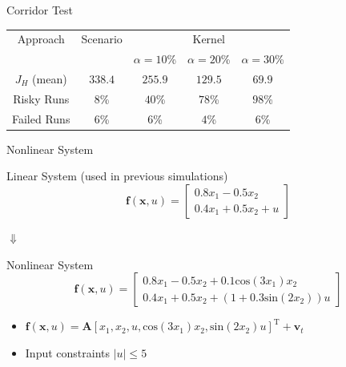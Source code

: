 \documentclass[student, noshadow, itr, english, aspectratio=169]{ITR_LSR_slides}
\begin{document}
\begin{frame}{Corridor Test}
\begin{table}
\centering
\begin{tabular}{|c| c| c| c| c|}
\hline
Approach & Scenario &  \multicolumn{3}{|c|}{Kernel}\\  \cline{3-5} & &  $\alpha = 10$\% & $\alpha = 20$\% & $\alpha = 30$\% \\
\hline
$J_H$ (mean) & $338.4$ & $255.9$ & $129.5$ & $69.9$\\
\hline
Risky Runs & $8$\% & $40$\% & $78$\% & $98$\% \\
\hline
Failed Runs & $6$\% & $6$\% & $4$\% & $6$\% \\
\hline
\end{tabular}
\label{tab:results_corridor}
\end{table} 
\end{frame}



\begin{frame}{Nonlinear System}

\begin{block}{Linear System (used in previous simulations)}
\begin{equation*}
\boldsymbol{f}(\boldsymbol{x}, u) = 
\begin{bmatrix}
0.8  x_1 - 0.5 x_2 \\
0.4 x_1 + 0.5 x_2 + u
\end{bmatrix}
\end{equation*}
\end{block}	

\makebox[6.7cm]{\hfill} $\boldsymbol{\Downarrow}$ 

\begin{block}{Nonlinear System}
\begin{equation*}
\boldsymbol{f}(\boldsymbol{x}, u) = 
\begin{bmatrix}
0.8  x_1 - 0.5 x_2 + 0.1 \text{cos}(3 x_1) x_2\\
0.4 x_1 + 0.5 x_2 + (1 + 0.3 \text{sin} (2 x_2 )) u
\end{bmatrix}
\end{equation*}
\end{block}

\begin{itemize}
\item {} $\boldsymbol{f}(\boldsymbol{x}, u) = \boldsymbol{A} \left[x_1, x_2, u, \text{cos} ( 3 x_1) x_2, \text{sin} (2 x_2) u \right]^\text{T} + \boldsymbol{v}_{t}$
\item Input constraints $\left| u \right| \leq 5$
\end{itemize}

\end{frame}	
\end{document}
